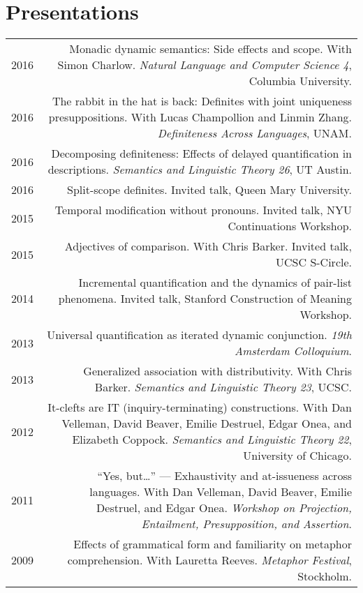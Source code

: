\documentclass[12pt]{article}
\begin{document}
\section*{Presentations}

\begin{longtable}{LR}
  2016 &  Monadic dynamic semantics: Side effects and scope. With Simon
          Charlow. \textit{Natural Language and Computer Science 4}, Columbia
          University.\\
  2016 &  The rabbit in the hat is back: Definites with joint uniqueness
          presuppositions. With Lucas Champollion and Linmin Zhang.
          \textit{Definiteness Across Languages}, UNAM.\\
  2016 &  Decomposing definiteness: Effects of delayed quantification in
          descriptions. \textit{Semantics and Linguistic Theory 26}, UT Austin.\\
  2016 &  Split-scope definites. Invited talk, Queen Mary University.\\
  2015 &  Temporal modification without pronouns. Invited talk, NYU
          Continuations Workshop.\\
  2015 &  Adjectives of comparison. With Chris Barker. Invited talk, UCSC
          S-Circle.\\
  2014 &  Incremental quantification and the dynamics of pair-list phenomena.
          Invited talk, Stanford Construction of Meaning Workshop.\\
  2013 &  Universal quantification as iterated dynamic conjunction. \textit{19th
          Amsterdam Colloquium}. \\
  2013 &  Generalized association with distributivity. With Chris Barker.
          \textit{Semantics and Linguistic Theory 23}, UCSC.\\
  2012 &  It-clefts are IT (inquiry-terminating) constructions. With Dan
          Velleman, David Beaver, Emilie Destruel, Edgar Onea, and Elizabeth
          Coppock. \textit{Semantics and Linguistic Theory 22}, University of
          Chicago.\\
  2011 &  ``Yes, but\dots'' --- Exhaustivity and at-issueness across languages.
           With Dan Velleman, David Beaver, Emilie Destruel, and Edgar Onea.
           \textit{Workshop on Projection, Entailment, Presupposition, and
           Assertion}.\\
  2009 &  Effects of grammatical form and familiarity on metaphor
          comprehension. With Lauretta Reeves. \textit{Metaphor Festival},
          Stockholm.
\end{longtable}
\end{document}
